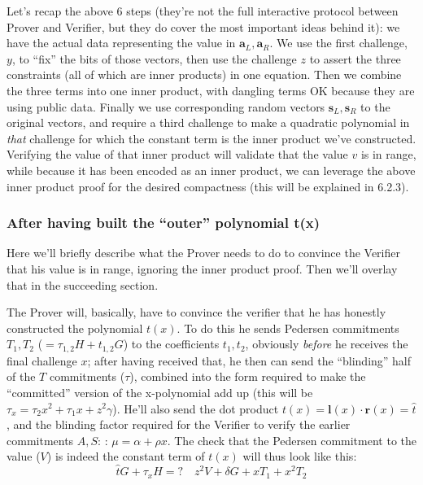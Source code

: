 \documentclass[10pt,a4paper]{article}
\begin{document}
Let's recap the above 6 steps (they're not the full interactive protocol
between Prover and Verifier, but they do cover the most important ideas
behind it): we have the actual data representing the value in $\mathbf{a}_L, \mathbf{a}_R$. We use
the first challenge, $y$, to ``fix'' the bits of those vectors, then use
the challenge $z$ to assert the three constraints (all of which are inner
products) in one equation. Then we combine the three terms into one
inner product, with dangling terms OK because they are using public
data. Finally we use corresponding random vectors $\mathbf{s}_L, \mathbf{s}_R$ to the original
vectors, and require a third challenge to make a quadratic polynomial in
\emph{that} challenge for which the constant term is the inner product
we've constructed. Verifying the value of that inner product will
validate that the value $v$ is in range, while because it has been encoded
as an inner product, we can leverage the above inner product proof for
the desired compactness (this will be explained in 6.2.3).

\hypertarget{after-having-built-the-outer-polynomial-tx}{%
\subsubsection[After having built the ``outer'' polynomial
t(x)]{\texorpdfstring{\protect\hypertarget{anchor-56}{}{}After having
built the ``outer'' polynomial
t(x)}{After having built the ``outer'' polynomial t(x)}}\label{after-having-built-the-outer-polynomial-tx}}

Here we'll briefly describe what the Prover needs to do to convince the
Verifier that his value is in range, ignoring the inner product proof.
Then we'll overlay that in the succeeding section.

The Prover will, basically, have to convince the verifier that he has
honestly constructed the polynomial $t(x)$. To do this he sends Pedersen
commitments $T_1, T_2$ ($=\tau_{1,2} H + t_{1,2} G$) to the coefficients $t_1, t_2$, obviously \emph{before} he receives
the final challenge $x$; after having received that, he then can send the
``blinding'' half of the $T$ commitments ($\tau$), combined into the form required
to make the ``committed'' version of the x-polynomial add up (this will
be $\tau_x = \tau_2x^2 + \tau_1x+z^2\gamma$). He'll also send the dot product $t(x) = \textbf{l}(x)\cdot \textbf{r}(x) = \hat{t}$, and the blinding factor required
for the Verifier to verify the earlier commitments $A, S$: : $\mu = \alpha + \rho x$. The check that
the Pedersen commitment to the value ($V$) is indeed the constant term of $t(x)$
will thus look like this:
\[\hat{t}G + \tau_x H =? \quad z^2V + \delta G + xT_1 + x^2T_2\]
\end{document}
